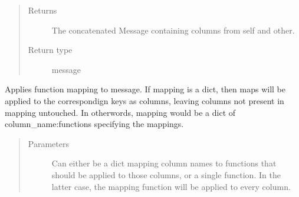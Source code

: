 \documentclass[letterpaper,10pt,english]{sphinxmanual}
\begin{document}
\begin{fulllineitems}
\begin{fulllineitems}
\begin{quote}
\begin{description}
%
\begin{sphinxVerbatim}[commandchars=\\\{\}]
   \PYG{p}{[}\PYG{p}{]} 
   \PYG{p}{[}\PYG{p}{]} 
   
\end{sphinxVerbatim}


\item[{Returns}] \leavevmode
The concatenated Message containing columns from self and other.

\item[{Return type}] \leavevmode
message

\end{description}\end{quote}

\end{fulllineitems}


\begin{fulllineitems}
\label{\detokenize{Fireworks:Fireworks.core.message.Message.map}}
Applies function mapping to message. If mapping is a dict, then maps will be applied to the correspondign keys as columns, leaving
columns not present in mapping untouched.
In otherwords, mapping would be a dict of column\_name:functions specifying the mappings.
\begin{quote}\begin{description}
\item[{Parameters}] \leavevmode
{} \textendash{} Can either be a dict mapping column names to functions that should be applied to those columns, or a single function.
In the latter case, the mapping function will be applied to every column.


\end{description}
\end{quote}
\end{fulllineitems}
\end{fulllineitems}
\end{document}
